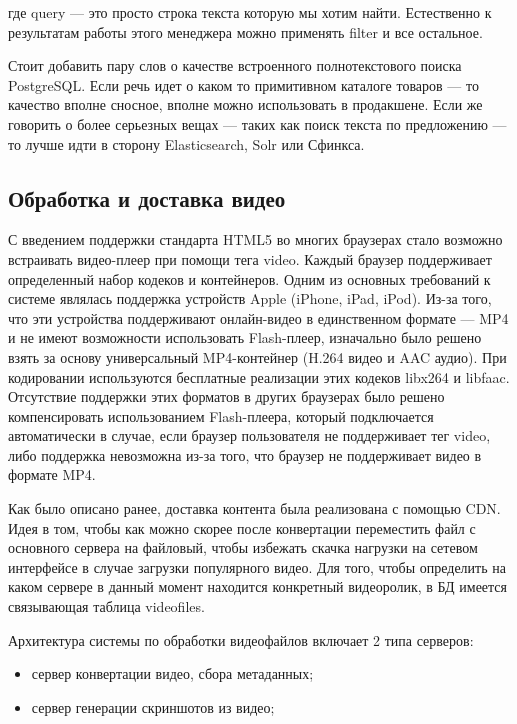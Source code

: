 где query — это просто строка текста которую мы хотим найти. Естественно к результатам работы этого менеджера
можно применять filter и все остальное.

Стоит добавить пару слов о качестве встроенного полнотекстового поиска PostgreSQL.
Если речь идет о каком то примитивном каталоге товаров — то качество вполне сносное, вполне можно использовать в продакшене.
Если же говорить о более серьезных вещах — таких как поиск текста по предложению — то лучше идти в сторону Elasticsearch, Solr
или Сфинкса.

\subsection{Обработка и доставка видео}

С введением поддержки стандарта HTML5 во многих браузерах стало возможно встраивать видео-плеер при помощи тега video.
Каждый браузер поддерживает определенный набор кодеков и контейнеров. Одним из основных требований к системе являлась
поддержка устройств Apple (iPhone, iPad, iPod). Из-за того, что эти устройства поддерживают онлайн-видео
в единственном формате — MP4 и не имеют возможности использовать Flash-плеер, изначально было решено взять за
основу универсальный MP4-контейнер (H.264 видео и AAC аудио). При кодировании используются бесплатные реализации этих
кодеков libx264 и libfaac. Отсутствие поддержки этих форматов в других браузерах было решено компенсировать
использованием Flash-плеера, который подключается автоматически в случае, если браузер пользователя не поддерживает
тег video, либо поддержка невозможна из-за того, что браузер не поддерживает видео в формате MP4.

Как было описано ранее, доставка контента была реализована с помощью CDN.
Идея в том, чтобы как можно скорее после конвертации переместить файл с основного сервера на файловый,
чтобы избежать скачка нагрузки на сетевом интерфейсе в случае загрузки популярного видео.
Для того, чтобы определить на каком сервере в данный момент находится конкретный видеоролик,
в БД имеется связывающая таблица videofiles.

Архитектура системы по обработки видеофайлов включает 2 типа серверов:

\begin{itemize}[wide,topsep=0pt]
  \itemsep0em
  \item сервер конвертации видео, сбора метаданных;
  \item сервер генерации скриншотов из видео;
\end{itemize}

